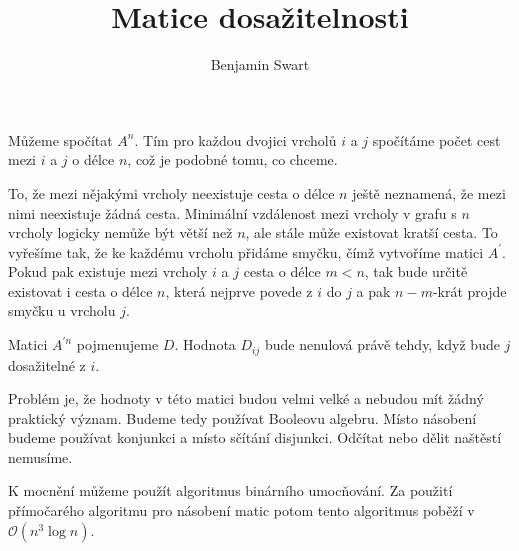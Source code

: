 \documentclass{article}
\title{Matice dosažitelnosti}
\author{Benjamin Swart}
\begin{document}
Můžeme spočítat $A^n$. Tím pro každou dvojici vrcholů $i$ a $j$ spočítáme počet cest mezi $i$ a $j$ o délce $n$, což je podobné tomu, co chceme.

To, že mezi nějakými vrcholy neexistuje cesta o délce $n$ ještě neznamená, že mezi nimi neexistuje žádná cesta. Minimální vzdálenost mezi vrcholy v grafu s $n$ vrcholy logicky nemůže být větší než $n$, ale stále může existovat kratší cesta. To vyřešíme tak, že ke každému vrcholu přidáme smyčku, čímž vytvoříme matici $A^\prime$. Pokud pak existuje mezi vrcholy $i$ a $j$ cesta o délce $m < n$, tak bude určitě existovat i cesta o délce $n$, která nejprve povede z $i$ do $j$ a pak $n - m$-krát projde smyčku u vrcholu $j$.

Matici $A^{\prime n}$ pojmenujeme $D$. Hodnota $D_{i j}$ bude nenulová právě tehdy, když bude $j$ dosažitelné z $i$.

Problém je, že hodnoty v této matici budou velmi velké a nebudou mít žádný praktický význam. Budeme tedy používat Booleovu algebru. Místo násobení budeme používat konjunkci a místo sčítání disjunkci. Odčítat nebo dělit naštěstí nemusíme.

K mocnění můžeme použít algoritmus binárního umocňování. Za použití přímočarého algoritmu pro násobení matic potom tento algoritmus poběží v $\mathcal{O} \left(n^3 \log{n}\right)$.
\end{document}
